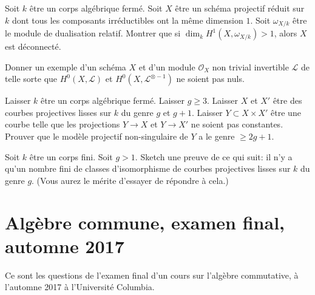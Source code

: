 \begin{exercise}
\label{exercise-count-components}
Soit $k$ être un corps algébrique fermé. Soit $X$ être
un schéma projectif réduit sur $k$ dont tous les composants irréductibles
ont la même dimension $1$. Soit $\omega_{X/k}$ être le
module de dualisation relatif. Montrer que
si $\dim_k H^1(X, \omega_{X/k}) > 1$, alors $X$ est déconnecté.
\end{exercise}

\begin{exercise}
\label{exercise-sections-L-L-inverse}
Donner un exemple d'un schéma $X$ et d'un module
$\mathcal{O}_X$ non trivial invertible $\mathcal{L}$ de telle sorte
que $H^0(X, \mathcal{L})$ et $H^0(X, \mathcal{L}^{\otimes -1})$ ne soient
pas nuls.
\end{exercise}

\begin{exercise}
\label{exercise-in-product}
Laisser $k$ être un corps algébrique fermé. Laisser $g \geq 3$. Laisser
$X$ et $X'$ être des courbes projectives lisses sur $k$ du genre
$g$ et $g + 1$. Laisser $Y \subset X \times X'$
être une courbe telle que les projections $Y \to X$ et $Y \to
X'$ ne soient pas constantes. Prouver que le modèle projectif non-singulaire de $Y$
a le genre $\geq 2g + 1$.
\end{exercise}

\begin{exercise}
\label{exercise-finitely-many}
Soit $k$ être un corps fini. Soit $g > 1$. Sketch une preuve de
ce qui suit: il n'y a qu'un nombre fini de
classes d'isomorphisme de courbes projectives lisses sur $k$ du
genre $g$. (Vous aurez le mérite d'essayer de répondre à cela.)
\end{exercise}







\section{Algèbre commune, examen final, automne 2017}
\label{section-final-exam-fall-2017}

\noindent
Ce sont les questions de l'examen final d'un cours sur l'algèbre commutative,
à l'automne 2017 à l'Université Columbia.

